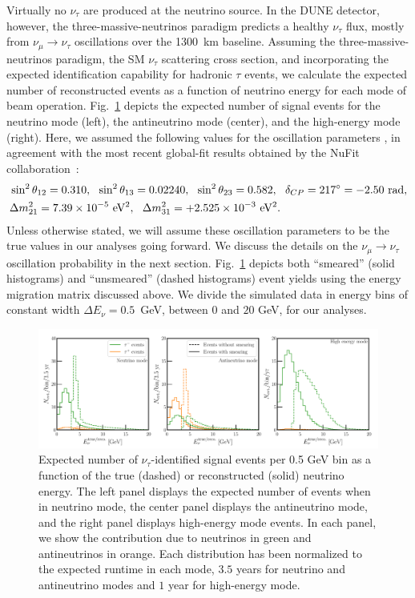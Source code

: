 \documentclass[aps,prd,onecolumn,nofootinbib,superscriptaddress, 11pt]{revtex4}
\begin{document}
Virtually no $\nu_{\tau}$ are produced at the neutrino source. In the DUNE detector, however, the three-massive-neutrinos paradigm predicts a healthy $\nu_{\tau}$ flux, mostly from $\nu_{\mu}\to\nu_{\tau}$  oscillations over the 1300~km baseline. Assuming the three-massive-neutrinos paradigm, the SM $\nu_{\tau}$ scattering cross section, and incorporating the expected identification capability for hadronic $\tau$ events, we calculate the expected number of reconstructed events as a function of neutrino energy for each mode of beam operation. Fig.~\ref{fig:EventYields} depicts the expected number of signal events for the neutrino mode (left), the antineutrino mode (center), and the high-energy mode (right). Here, we assumed the following values for the oscillation parameters \cite{Tanabashi:2018oca}, in agreement with the most recent global-fit results obtained by the NuFit collaboration~\cite{Esteban:2018azc}: 
\begin{eqnarray}
&\sin^2\theta_{12} = 0.310,~~\sin^2\theta_{13} = 0.02240,~~\sin^2\theta_{23} = 0.582,~~\delta_{CP} = 217^\circ = -2.50~{\rm rad}, \nonumber \\ 
& \Delta m_{21}^2 = 7.39 \times 10^{-5}~{\rm eV^2},~~\Delta m_{31}^2 = +2.525\times 10^{-3}~ {\rm eV^2}. \label{eq:nufit}
\end{eqnarray}
 Unless otherwise stated, we will assume these oscillation parameters to be the true values in our analyses going forward. We discuss the details on the $\nu_{\mu}\to\nu_{\tau}$ oscillation probability in the next section. Fig.~\ref{fig:EventYields} depicts both ``smeared'' (solid histograms) and ``unsmeared'' (dashed histograms) event yields using the energy migration matrix discussed above. We divide the simulated data in energy bins of constant width $\Delta E_\nu = 0.5$~GeV, between $0$ and $20$ GeV, for our analyses.
\begin{figure}[ht]
\centerline{
\includegraphics[width=1\textwidth]{SmearingImpact.pdf}}
\caption{Expected number of $\nu_\tau$-identified signal events per 0.5 GeV bin as a function of the true (dashed) or reconstructed (solid) neutrino energy. The left panel displays the expected number of events when in neutrino mode, the center panel displays the antineutrino mode, and the right panel displays high-energy mode events. In each panel, we show the contribution due to neutrinos in green and antineutrinos in orange. Each distribution has been normalized to the expected runtime in each mode, $3.5$ years for neutrino and antineutrino modes and $1$ year for high-energy mode.}\label{fig:EventYields}
\end{figure}
\end{document}
